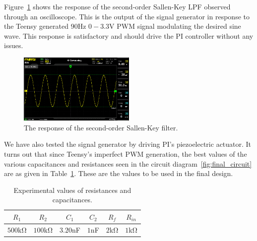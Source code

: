 
Figure~\ref{fig:sallenkey_osc} shows the response of the second-order Sallen-Key
LPF observed through an oscilloscope. This is the output of the signal generator
in response to the Teensy generated $90$\unit{\hertz} $0-3.3$\unit{\volt} PWM
signal modulating the desired sine wave. This response is satisfactory and
should drive the PI controller without any issues.

\begin{figure}[bh]
    \includegraphics[width=0.5\textwidth]{./figures/output_osc.jpg}
    \caption{The response of the second-order Sallen-Key filter.}
    \label{fig:sallenkey_osc}
\end{figure}

We have also tested the signal generator by driving PI's piezoelectric actuator.
It turns out that since Teensy's imperfect PWM generation, the best values of
the various capacitances and resistances seen in the circuit
diagram~\ref{fig:final_circuit} are as given in Table~\ref{tab:expvalues}. These
are the values to be used in the final design.

{\renewcommand{\arraystretch}{1.5}
\begin{table}
    \centering
    \caption{Experimental values of resistances and capacitances.}
    \begin{tabular}{*6c}
        \toprule
        $R_1$ & $R_2$ & $C_1$ & $C_2$ & $R_f$ & $R_{in}$ \\    
        \hline
        \midrule
        $500$\unit{\kilo\ohm} & $100$\unit{\kilo\ohm} & $3.20$\unit{\nano\farad}
          & $1$\unit{\nano\farad} & $2$\unit{\kilo\ohm} &
        $1$\unit{\kilo\ohm} \\
        \bottomrule
    \end{tabular}
    \label{tab:expvalues}
    \vspace{-1em}
\end{table}
}
